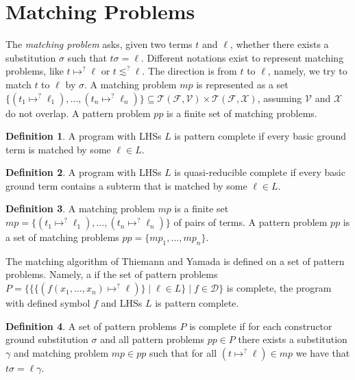 \documentclass{report}
\theoremstyle{definition}
\newtheorem{definition_inner}{Definition}
\newenvironment{definition}
  {\begin{customblock}\begin{definition_inner}}
  {\end{definition_inner}\end{customblock}}
\begin{document}
\section{Matching Problems}\label{section:matching}
The \textit{matching problem} asks, given two terms $t$ and $\ell$, whether there exists a substitution $\sigma$ such that $t\sigma = \ell$. Different notations exist to represent matching problems, like $t \mapsto^? \ell$ or $t \lesssim^? \ell$. The direction is from $t$ to $\ell$, namely, we try to match $t$ to $\ell$ by $\sigma$. A matching problem $mp$ is represented as a set $\{(t_1 \mapsto^? \ell_1), ..., (t_n \mapsto^? \ell_n)\} \subseteq \mathcal{T}(\mathcal{F}, \mathcal{V}) \times \mathcal{T}(\mathcal{F}, \mathcal{X})$, assuming $\mathcal{V}$ and $\mathcal{X}$ do not overlap. A pattern problem $pp$ is a finite set of matching problems. 

\begin{definition}
    A program with LHSs $L$ is pattern complete if every basic ground term is matched by some $\ell \in L$.
\end{definition}

\begin{definition}
    A program with LHSs $L$ is quasi-reducible complete if every basic ground term contains a subterm that is matched by some $\ell \in L$.
\end{definition}

\begin{definition}
    A matching problem $mp$ is a finite set $mp = \{(t_1\mapsto^? \ell_1), \dots, (t_n\mapsto^? \ell_n)\}$ of pairs of terms. A pattern problem $pp$ is a set of matching problems $pp = \{mp_1, \dots, mp_n\}$.
\end{definition}

The matching algorithm of Thiemann and Yamada \cite{thiemann} is defined on a set of pattern problems. Namely, a if the set of pattern problems $P = \{\{\{(f(x_1,\dots,x_n)\mapsto^? \ell)\} \mid \ell \in L\} \mid f \in \mathcal{D}\}$ is complete, the program with defined symbol $f$ and LHSs $L$ is pattern complete.

\begin{definition}
    A set of pattern problems $P$ is complete if for each constructor ground substitution $\sigma$ and all pattern problems $pp \in P$ there exists a substitution $\gamma$ and matching problem $mp \in pp$ such that for all $(t\mapsto^? \ell) \in mp$ we have that $t\sigma = \ell\gamma$.
\end{definition}
\end{document}
